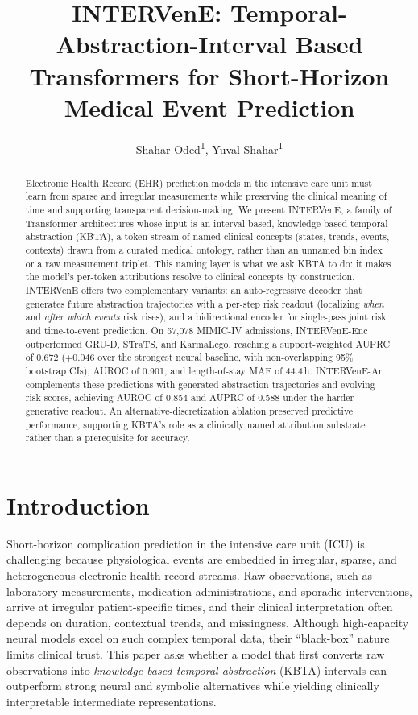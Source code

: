 \documentclass[letterpaper]{article} %
\title{INTERVenE: Temporal-Abstraction-Interval Based Transformers for Short-Horizon Medical Event Prediction}
\author{
    Shahar Oded\textsuperscript{\rm 1},
    Yuval Shahar\textsuperscript{\rm 1}
}
\begin{document}
\maketitle

\begin{abstract}
Electronic Health Record (EHR) prediction models in the intensive care unit must learn from sparse and irregular measurements while preserving the clinical meaning of time and supporting transparent decision-making. We present INTERVenE, a family of Transformer architectures whose input is an interval-based, knowledge-based temporal abstraction (KBTA), a token stream of named clinical concepts (states, trends, events, contexts) drawn from a curated medical ontology, rather than an unnamed bin index or a raw measurement triplet. This naming layer is what we ask KBTA to do: it makes the model's per-token attributions resolve to clinical concepts by construction. INTERVenE offers two complementary variants: an auto-regressive decoder that generates future abstraction trajectories with a per-step risk readout (localizing \emph{when} and \emph{after which events} risk rises), and a bidirectional encoder for single-pass joint risk and time-to-event prediction. On 57,078 MIMIC-IV admissions, INTERVenE-Enc outperformed GRU-D, STraTS, and KarmaLego, reaching a support-weighted AUPRC of 0.672 ($+0.046$ over the strongest neural baseline, with non-overlapping 95\% bootstrap CIs), AUROC of 0.901, and length-of-stay MAE of 44.4\,h. INTERVenE-Ar complements these predictions with generated abstraction trajectories and evolving risk scores, achieving AUROC of 0.854 and AUPRC of 0.588 under the harder generative readout. An alternative-discretization ablation preserved predictive performance, supporting KBTA's role as a clinically named attribution substrate rather than a prerequisite for accuracy.
\end{abstract}

\section{Introduction}

Short-horizon complication prediction in the intensive care unit (ICU) is challenging because physiological events are embedded in irregular, sparse, and heterogeneous electronic health record streams. Raw observations, such as laboratory measurements, medication administrations, and sporadic interventions, arrive at irregular patient-specific times, and their clinical interpretation often depends on duration, contextual trends, and missingness. Although high-capacity neural models excel on such complex temporal data, their ``black-box'' nature limits clinical trust. This paper asks whether a model that first converts raw observations into \textit{knowledge-based temporal-abstraction} (KBTA) intervals can outperform strong neural and symbolic alternatives while yielding clinically interpretable intermediate representations.
\end{document}
